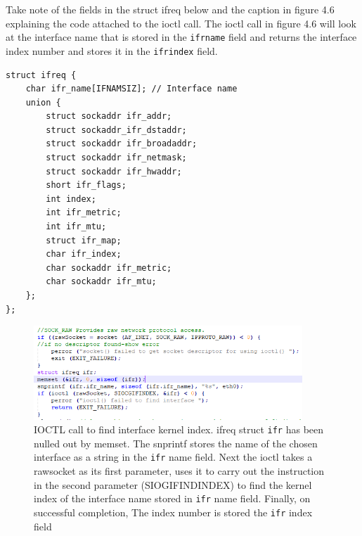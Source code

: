 Take note of the fields in the struct ifreq below and the caption in figure 4.6 explaining the code attached to the ioctl call. The ioctl call in figure 4.6 will look at the interface name that is stored in the {\tt ifr\textunderscore name} field and returns the interface index number and stores it in the {\tt ifr\textunderscore index} field. \\


\begin{lstlisting}
struct ifreq { 
    char ifr_name[IFNAMSIZ]; // Interface name
    union {
        struct sockaddr ifr_addr;
        struct sockaddr_ifr_dstaddr; 
        struct sockaddr ifr_broadaddr;
        struct sockaddr ifr_netmask;
        struct sockaddr ifr_hwaddr;
        short ifr_flags;
        int index;
        int ifr_metric;
        int ifr_mtu;
        struct ifr_map;
        char ifr_index;
        char sockaddr ifr_metric;
        char sockaddr ifr_mtu;
    };
};
\end{lstlisting}

\begin{figure}[h!] 
    \centering
    \includegraphics[width=0.9\textwidth]{Struct_ifreq.PNG}
    \caption{IOCTL call to find interface kernel index. ifreq struct {\tt ifr} has been nulled out by memset. The snprintf stores the name of the chosen interface as a string in the {\tt ifr} name field. Next the ioctl takes a rawsocket as its first parameter, uses it to carry out the instruction in the second parameter (SIOGIFINDINDEX) to find the kernel index of the interface name stored in {\tt ifr} name field. Finally, on successful completion, The index number is stored the {\tt ifr} index field}
    \label{fig: http://man7.org/linux/man-pages/man7/netdevice.7.html}
\end{figure}

